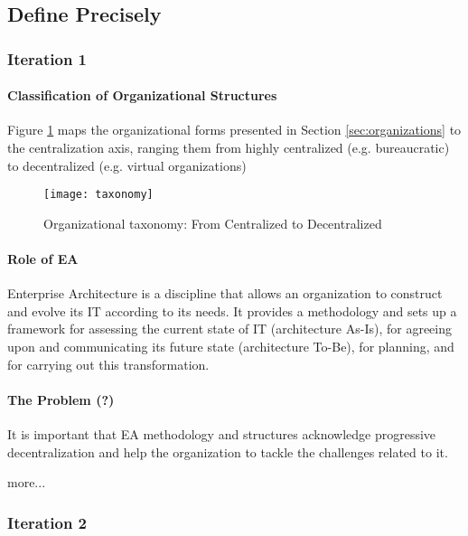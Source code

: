 \subsection{Define Precisely}

\subsubsection*{Iteration 1}

\paragraph*{Classification of Organizational Structures}

Figure \ref{fig:taxonomy} maps the organizational forms presented in Section \ref{sec:organizations} to the centralization axis, ranging them from highly centralized (e.g. bureaucratic) to decentralized (e.g. virtual organizations)

\begin{figure}
\centering
\texttt{[image: taxonomy]}
\caption{Organizational taxonomy: From Centralized to Decentralized}
\label{fig:taxonomy}
\end{figure}

\paragraph*{Role of EA}

Enterprise Architecture is a discipline  that allows an organization to construct and evolve its IT according to its needs. It provides a methodology and sets up a framework for assessing the current state of IT (architecture As-Is), for agreeing upon and communicating its future state (architecture To-Be), for planning, and for carrying out this transformation.

\paragraph*{The Problem (?)} 

It is important that  EA methodology and structures acknowledge progressive decentralization and help the organization to tackle the challenges related to it.    

more...
  

\subsubsection*{Iteration 2}

